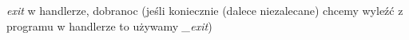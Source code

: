 \textit{exit} w handlerze, dobranoc (jeśli koniecznie (dalece niezalecane) chcemy wyleźć z programu w handlerze to używamy \textit{\_exit})